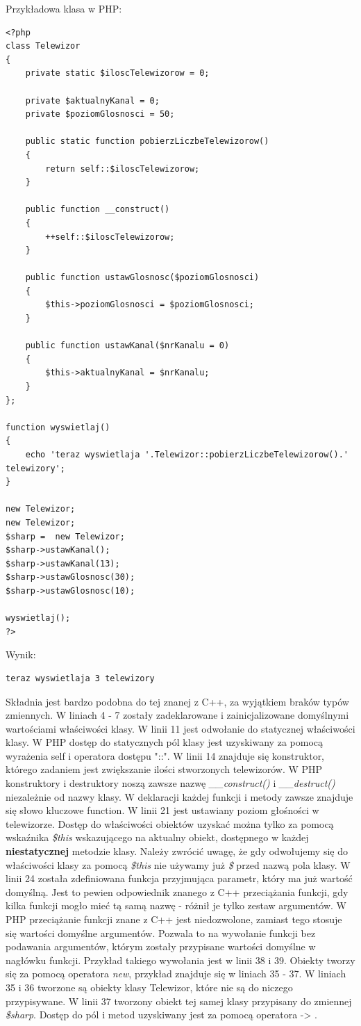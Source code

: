 \documentclass[a4paper,10pt]{article}
\begin{document}
Przykładowa klasa w PHP: \\
\begin{verbatim}
<?php
class Telewizor
{
	private static $iloscTelewizorow = 0;
	
	private $aktualnyKanal = 0;
	private $poziomGlosnosci = 50;
	
	public static function pobierzLiczbeTelewizorow()
	{
		return self::$iloscTelewizorow;
	}
	
	public function __construct()
	{
		++self::$iloscTelewizorow;
	}
	
	public function ustawGlosnosc($poziomGlosnosci)
	{
		$this->poziomGlosnosci = $poziomGlosnosci;
	}
	
	public function ustawKanal($nrKanalu = 0)
	{
		$this->aktualnyKanal = $nrKanalu;
	}
};

function wyswietlaj()
{
	echo 'teraz wyswietlaja '.Telewizor::pobierzLiczbeTelewizorow().' telewizory';
}

new Telewizor;
new Telewizor;
$sharp =  new Telewizor;
$sharp->ustawKanal();
$sharp->ustawKanal(13);
$sharp->ustawGlosnosc(30);
$sharp->ustawGlosnosc(10);

wyswietlaj();
?>
\end{verbatim}
Wynik:
\begin{verbatim}
teraz wyswietlaja 3 telewizory
\end{verbatim}
Składnia jest bardzo podobna do tej znanej z C++, za wyjątkiem braków typów zmiennych. W liniach 4 - 7 zostały zadeklarowane i zainicjalizowane domyślnymi wartościami właściwości klasy. W linii 11 jest odwołanie do statycznej właściwości klasy. W PHP dostęp do statycznych pól klasy jest uzyskiwany za pomocą wyrażenia self i operatora dostępu "::". W linii 14 znajduje się konstruktor, którego zadaniem jest zwiększanie ilości stworzonych telewizorów. W PHP konstruktory i destruktory noszą zawsze nazwę \textit{\_\_construct()} i \textit{\_\_destruct()} niezależnie od nazwy klasy. W deklaracji każdej funkcji i metody zawsze znajduje się słowo kluczowe function. W linii 21 jest ustawiany poziom głośności w telewizorze. Dostęp do właściwości obiektów uzyskać można tylko za pomocą wskaźnika \textit{\$this} wskazującego na aktualny obiekt, dostępnego w każdej \textbf{niestatycznej} metodzie klasy. Należy zwrócić uwagę, że gdy odwołujemy się do właściwości klasy za pomocą \textit{\$this} nie używamy już \textit{\$} przed nazwą pola klasy. W linii 24 została zdefiniowana funkcja przyjmująca parametr, który ma już wartość domyślną. Jest to pewien odpowiednik znanego z C++ przeciążania funkcji, gdy kilka funkcji mogło mieć tą samą nazwę - różnił je tylko zestaw argumentów. W PHP przeciążanie funkcji znane z C++ jest niedozwolone, zamiast tego stosuje się wartości domyślne argumentów. Pozwala to na wywołanie funkcji bez podawania argumentów, którym zostały przypisane wartości domyślne w nagłówku funkcji. Przykład takiego wywołania jest w linii 38 i 39.
Obiekty tworzy się za pomocą operatora \textit{new}, przykład znajduje się w liniach 35 - 37. W liniach 35 i 36 tworzone są obiekty klasy Telewizor, które nie są do niczego przypisywane. W linii 37 tworzony obiekt tej samej klasy przypisany do zmiennej \textit{\$sharp}. Dostęp do pól i metod uzyskiwany jest za pomocą operatora -> .
\end{document}
